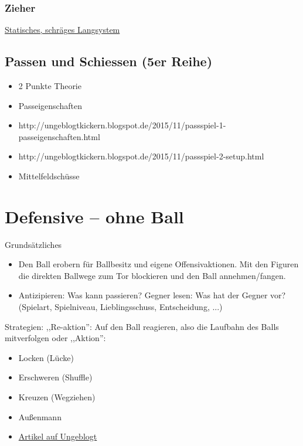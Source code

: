 \subsubsection{Zieher}
\href{http://ungeblogtkickern.blogspot.de/2015/09/system-zieher.html}{
    Statisches, schräges Langsystem}


\subsection{Passen und Schiessen (5er Reihe)}
\label{taktik:offensive:passen}

\begin{itemize}
    \item 2 Punkte Theorie
    \item Passeigenschaften
    \item http://ungeblogtkickern.blogspot.de/2015/11/passspiel-1-passeigenschaften.html
    \item http://ungeblogtkickern.blogspot.de/2015/11/passspiel-2-setup.html
    \item Mittelfeldschüsse 
\end{itemize}


\section{Defensive -- ohne Ball}
\label{taktik:defensive}

Grundsätzliches
\begin{itemize}
    \item Den Ball erobern für Ballbesitz und eigene Offensivaktionen. Mit den Figuren die direkten Ballwege zum Tor blockieren und den Ball annehmen/fangen. 
    \item Antizipieren: Was kann passieren? Gegner lesen: Was hat der Gegner vor? (Spielart, Spielniveau, Lieblingsschuss, Entscheidung, ...)
\end{itemize}

Strategien:
,,Re-aktion'': Auf den Ball reagieren, also die Laufbahn des Balls mitverfolgen oder ,,Aktion'':
\begin{itemize}
    \item Locken (Lücke)
    \item Erschweren (Shuffle)
    \item Kreuzen (Wegziehen)
    \item Außenmann 
    \item \href{http://ungeblogtkickern.blogspot.de/2015/06/defensivbewegungen-im-verteidigerbereich.html}{Artikel auf Ungeblogt}
\end{itemize}


